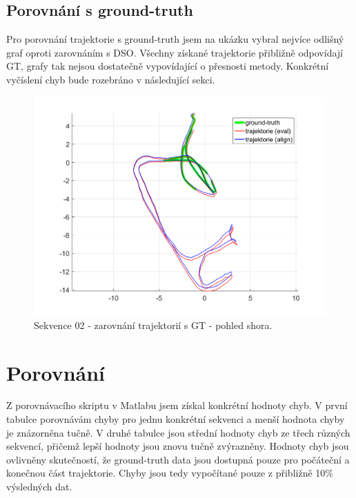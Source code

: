 \documentclass[12pt,a4paper]{report}
\begin{document}
\newpage
\subsection*{Porovnání s ground-truth}
Pro porovnání trajektorie s ground-truth jsem na ukázku vybral nejvíce odlišný graf oproti zarovnáním s DSO. Všechny získané trajektorie přibližně odpovídají  GT, grafy tak nejsou dostatečně vypovídající o přesnosti metody. Konkrétní vyčíslení chyb bude rozebráno v následující sekci.


\begin{figure}[H]
\centering
\includegraphics[width=1\textwidth]{img/m_ldso_02_2.png}
\caption{Sekvence 02 - zarovnání trajektorií s GT - pohled shora.}
\end{figure}

\section{Porovnání}
Z porovnávacího skriptu v Matlabu jsem získal konkrétní hodnoty chyb. V první tabulce porovnávám chyby pro jednu konkrétní sekvenci a menší hodnota chyby je znázorněna tučně. V druhé tabulce jsou střední hodnoty chyb ze třech různých sekvencí, přičemž lepší hodnoty jsou znovu tučně zvýrazněny. Hodnoty chyb jsou ovlivněny skutečností, že ground-truth data jsou dostupná pouze pro počáteční a konečnou část trajektorie. Chyby jsou tedy vypočítané pouze z přibližně 10\% výsledných dat. 
\end{document}
